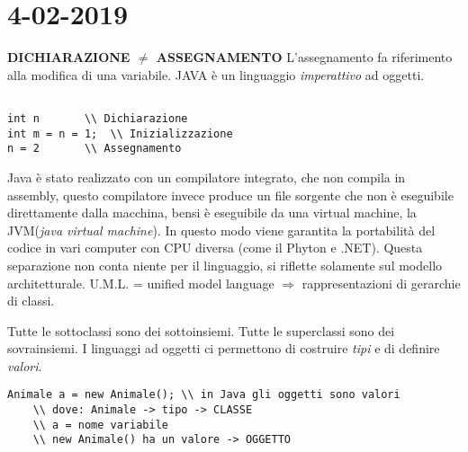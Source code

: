 

\newpage
\section{4-02-2019}
\par
\textbf{DICHIARAZIONE $\neq$ ASSEGNAMENTO} \newline
L'assegnamento fa riferimento alla modifica di una variabile. \newline
JAVA è un linguaggio \textit{imperattivo} ad oggetti.

\begin{lstlisting}[basicstyle=\small,]

int n		\\ Dichiarazione
int m = n = 1; 	\\ Inizializzazione
n = 2 		\\ Assegnamento

\end{lstlisting}

\noindent Java è stato realizzato con un compilatore integrato, che non compila in assembly, questo compilatore invece produce un file sorgente che non è eseguibile direttamente dalla macchina, bensi è eseguibile da una virtual machine, la JVM(\textit{java virtual machine}). In questo modo viene garantita la portabilità del codice in vari computer con CPU diversa (come il Phyton e .NET). \newline
Questa separazione non conta niente per il linguaggio, si riflette solamente sul modello architetturale. \newline
U.M.L. = unified model language $\Rightarrow$ rappresentazioni di gerarchie di classi. \newline

   
Tutte le sottoclassi sono dei sottoinsiemi. \newline
Tutte le superclassi sono dei sovrainsiemi. \newline
I linguaggi ad oggetti ci permettono di costruire \textit{tipi} e di definire \textit{valori}. \newline 

\begin{lstlisting}[basicstyle=\small,]
	Animale a = new Animale(); \\ in Java gli oggetti sono valori
	\\ dove: Animale -> tipo -> CLASSE
	\\ a = nome variabile
	\\ new Animale() ha un valore -> OGGETTO
\end{lstlisting}


